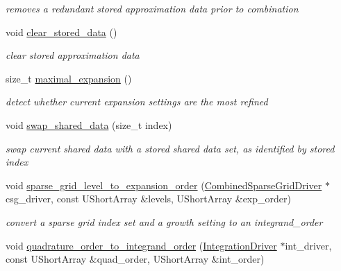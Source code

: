 \begin{DoxyCompactItemize}
\begin{DoxyCompactList}\small\item\em removes a redundant stored approximation data prior to combination \end{DoxyCompactList}\item 
void \hyperlink{classPecos_1_1SharedOrthogPolyApproxData_a263397cd08813d707b4084cf13cad679}{clear\+\_\+stored\+\_\+data} ()\label{classPecos_1_1SharedOrthogPolyApproxData_a263397cd08813d707b4084cf13cad679}

\begin{DoxyCompactList}\small\item\em clear stored approximation data \end{DoxyCompactList}\item 
size\+\_\+t \hyperlink{classPecos_1_1SharedOrthogPolyApproxData_a4c762dba27115d6fe5759c69f4cdb15b}{maximal\+\_\+expansion} ()\label{classPecos_1_1SharedOrthogPolyApproxData_a4c762dba27115d6fe5759c69f4cdb15b}

\begin{DoxyCompactList}\small\item\em detect whether current expansion settings are the most refined \end{DoxyCompactList}\item 
void \hyperlink{classPecos_1_1SharedOrthogPolyApproxData_ab71ff088de1226483e8c252e483d80fe}{swap\+\_\+shared\+\_\+data} (size\+\_\+t index)\label{classPecos_1_1SharedOrthogPolyApproxData_ab71ff088de1226483e8c252e483d80fe}

\begin{DoxyCompactList}\small\item\em swap current shared data with a stored shared data set, as identified by stored index \end{DoxyCompactList}\item 
void \hyperlink{classPecos_1_1SharedOrthogPolyApproxData_a774f7ff2f3b6679f3781ab4527e454d6}{sparse\+\_\+grid\+\_\+level\+\_\+to\+\_\+expansion\+\_\+order} (\hyperlink{classPecos_1_1CombinedSparseGridDriver}{Combined\+Sparse\+Grid\+Driver} $\ast$csg\+\_\+driver, const U\+Short\+Array \&levels, U\+Short\+Array \&exp\+\_\+order)
\begin{DoxyCompactList}\small\item\em convert a sparse grid index set and a growth setting to an integrand\+\_\+order \end{DoxyCompactList}\item 
void \hyperlink{classPecos_1_1SharedOrthogPolyApproxData_a0fb3bbf72d95413bb1fc92d5a203f085}{quadrature\+\_\+order\+\_\+to\+\_\+integrand\+\_\+order} (\hyperlink{classPecos_1_1IntegrationDriver}{Integration\+Driver} $\ast$int\+\_\+driver, const U\+Short\+Array \&quad\+\_\+order, U\+Short\+Array \&int\+\_\+order)\label{classPecos_1_1SharedOrthogPolyApproxData_a0fb3bbf72d95413bb1fc92d5a203f085}


\end{DoxyCompactItemize}
